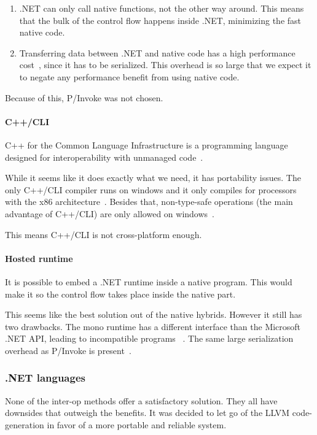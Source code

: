 \begin{enumerate}
    \item .NET can only call native functions, not the other way around.
        This means that the bulk of the control flow happens inside .NET, minimizing the fast native code.
    \item Transferring data between .NET and native code has a high performance cost~\cite{msdn_interop_performance}, since it has to be serialized.
        This overhead is so large that we expect it to negate any performance benefit from using native code.
\end{enumerate}

Because of this, P/Invoke was not chosen.

\paragraph{C++/CLI}
C++ for the Common Language Infrastructure is a programming language designed for interoperability with unmanaged code~\cite{ecma372}.

While it seems like it does exactly what we need, it has portability issues.
The only C++/CLI compiler runs on windows and it only compiles for processors with the x86 architecture~\cite{mono_c++cli}.
Besides that, non-type-safe operations (the main advantage of C++/CLI) are only allowed on windows~\cite{mono_c++cli}.

This means C++/CLI is not cross-platform enough.

\paragraph{Hosted runtime}
It is possible to embed a .NET runtime inside a native program.
This would make it so the control flow takes place inside the native part.

This seems like the best solution out of the native hybrids.
However it still has two drawbacks.
The mono runtime has a different interface than the Microsoft .NET API, leading to incompatible programs ~\cite{mono_embedding}.
The same large serialization overhead as P/Invoke is present~\cite{msdn_hosted}.

\subsubsection{.NET languages}
None of the inter-op methods offer a satisfactory solution.
They all have downsides that outweigh the benefits.
It was decided to let go of the LLVM code-generation in favor of a more portable and reliable system.

